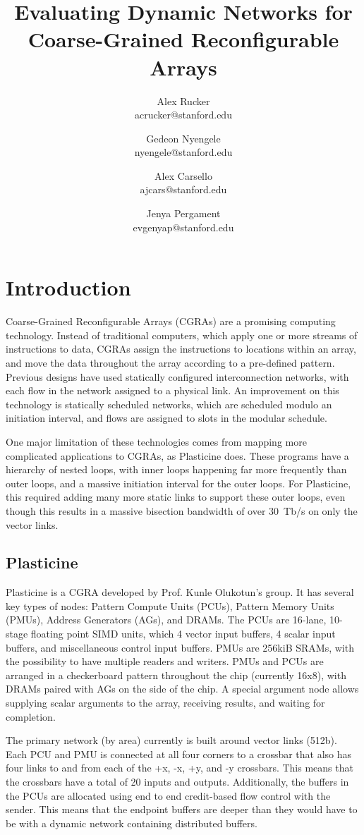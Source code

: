 \documentclass[11pt,twocolumn]{article}
\title{Evaluating Dynamic Networks for Coarse-Grained Reconfigurable Arrays}
\author{Alex Rucker\\acrucker@stanford.edu \and Gedeon Nyengele\\nyengele@stanford.edu \and Alex Carsello\\ajcars@stanford.edu \and Jenya Pergament\\evgenyap@stanford.edu}
\begin{document}
\maketitle
\section{Introduction}
Coarse-Grained Reconfigurable Arrays (CGRAs) are a promising computing
technology. Instead of traditional computers, which apply one or more streams
of instructions to data, CGRAs assign the instructions to locations within an
array, and move the data throughout the array according to a pre-defined
pattern. Previous designs have used statically configured interconnection
networks, with each flow in the network assigned to a physical link. An
improvement on this technology is statically scheduled networks, which are
scheduled modulo an initiation interval, and flows are assigned to slots in the
modular schedule. 

One major limitation of these technologies comes from mapping more complicated
applications to CGRAs, as Plasticine does. These programs have a hierarchy of
nested loops, with inner loops happening far more frequently than outer loops,
and a massive initiation interval for the outer loops. For Plasticine, this
required adding many more static links to support these outer loops, even
though this results in a massive bisection bandwidth of over \SI{30}{Tb/s} on
only the vector links.

\subsection{Plasticine}
Plasticine is a CGRA developed by Prof. Kunle Olukotun's group. It has several
key types of nodes: Pattern Compute Units (PCUs), Pattern Memory Units (PMUs),
Address Generators (AGs), and DRAMs. The PCUs are 16-lane, 10-stage floating
point SIMD units, which 4 vector input buffers, 4 scalar input buffers, and
miscellaneous control input buffers. PMUs are 256kiB SRAMs, with the
possibility to have multiple readers and writers. PMUs and PCUs are arranged in
a checkerboard pattern throughout the chip (currently 16x8), with DRAMs paired
with AGs on the side of the chip. A special argument node allows supplying
scalar arguments to the array, receiving results, and waiting for completion. 

The primary network (by area) currently is built around vector links (512b).
Each PCU and PMU is connected at all four corners to a crossbar that also has
four links to and from each of the +x, -x, +y, and -y crossbars. This means
that the crossbars have a total of 20 inputs and outputs. Additionally, the
buffers in the PCUs are allocated using end to end credit-based flow control
with the sender. This means that the endpoint buffers are deeper than they
would have to be with a dynamic network containing distributed buffers.
\end{document}
